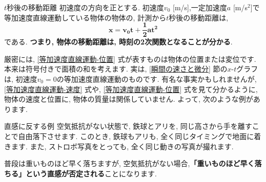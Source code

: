 \documentclass[11pt,dvipdfmx]{jsarticle}
\numberwithin{equation}{section} %
\begin{document}
\begin{freebox}{$t$秒後の移動距離}
    初速度の方向を正とする. 初速度$v_{0}$ [m/s],一定加速度$a$ [m/s$^2$]で等加速度直線運動している物体の物体の, 計測から$t$秒後の移動距離は, 
    \begin{equation}
        \bm{x} = \bm{v_{0}t} + \bm{\frac{1}{2}at^2} \label{等加速度直線運動-位置}
    \end{equation}
    である. \textbf{つまり, 物体の移動距離は, 時刻の2次関数となることが分かる}. 
\end{freebox}
厳密には, \eqref{等加速度直線運動-位置} 式が表すものは物体の位置または変位です. 本来は符号付きで面積の和を考えます. 実は, \ref{瞬間の速さと微分} 節の$x$-$t$グラフは, 初速度$v_{0} = 0$の等加速度直線運動のものです.
有名な事実かもしれませんが, \eqref{等加速度直線運動-速度} 式や, \eqref{等加速度直線運動-位置} 式を見て分かるように, 物体の速度と位置に, 物体の質量は関係していません. よって, 次のような例があります.
\begin{exbox}{直感に反する例}
    空気抵抗がない状態で, 鉄球とアリを, 同じ高さから手を離すことで自由落下させます. このとき, 鉄球もアリも, 全く同じタイミングで地面に着きます. また, ストロボ写真をとっても, 全く同じ動きの写真が撮れます.
\end{exbox}
普段は重いものほど早く落ちますが, 空気抵抗がない場合,\textbf{「重いものほど早く落ちる」という直感が否定される}ことになります. 
\end{document}
